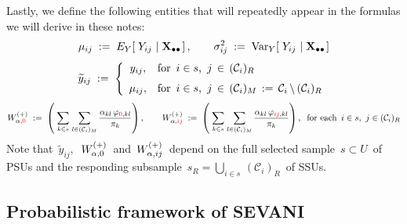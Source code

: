 \vskip 0.3cm
\noindent
Lastly, we define the following entities that will repeatedly appear
in the formulas we will derive in these notes:
\begin{equation*}
\mu_{ij}
\; := \;
    E_{Y}\!\left[\;Y_{ij}\,\left\vert\;\mathbf{X}_{\bullet\bullet}\right.\right],
\quad\quad
\sigma_{ij}^{2}
\; := \;
    \textnormal{Var}_{Y}\!\left[\;
        Y_{ij}
        \,\left\vert\;
        \mathbf{X}_{\bullet\bullet}
        \right.
        \right]
\end{equation*}
\begin{equation*}
\widetilde{y}_{ij}
\; := \;
    \left\{\begin{array}{cl}
        y_{ij}, & \textnormal{for \,$i \in s$,\, $j \,\in\, (\mathcal{C}_{i})_{R}$}
        \\
        \overset{{\color{white}\textnormal{\large1}}}{\mu_{ij}}, & \textnormal{for \,$i \in s$,\, $j \,\in\, (\mathcal{C}_{i})_{M} \,:=\, \mathcal{C}_{i} \,\backslash\, (\mathcal{C}_{i})_{R}$}
        \end{array}\right.
\end{equation*}
\begin{equation*}
W^{(+)}_{\alpha,{\color{red}0}}
\; := \;
    \left(\;
        \underset{k \in s}{\sum}\;
        \underset{l \in (\mathcal{C}_{i})_{M}}{\sum}\,
        \dfrac{
            \alpha_{kl}\,\varphi_{{\color{red}0},kl}
            }{
            \pi_{k}
            }
        \right),
\quad\quad
W^{(+)}_{\alpha,{\color{red}ij}}
\; := \;
    \left(\;
        \underset{k \in s}{\sum}\;
        \underset{l \in (\mathcal{C}_{i})_{M}}{\sum}\,
        \dfrac{
            \alpha_{kl}\,\varphi_{{\color{red}ij},kl}
            }{
            \pi_{k}
            }
        \right),
\;\;
\textnormal{for each \,$i \in s$,\, $j \in (\mathcal{C}_{i})_{R}$}
\end{equation*}
\vskip 0.3cm
\noindent
Note that
\,$\widetilde{y}_{ij}$,\,
\,$W^{(+)}_{\alpha,{\color{black}0}}$\,
and
\,$W^{(+)}_{\alpha,{\color{black}ij}}$\,
depend on the full selected sample
\,$s \subset U$\,
of PSUs and the responding subsample
\,$s_{R} = \underset{i \in s}{\bigcup}\,(\mathcal{C}_{i})_{R}$\,
of SSUs.


\vskip 1.0cm
\subsection{Probabilistic framework of SEVANI \cite{Beaumont2011}}
\label{GeneralizedTotalProbabilisticFramework}
\setcounter{theorem}{0}

